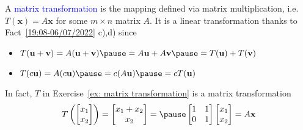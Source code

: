 \documentclass{beamer}
\theoremstyle{definition}
\theoremstyle{remark}
\begin{document}
\begin{frame}[t]
\begin{definition}
A \textcolor{blue}{matrix transformation} is the mapping defined via matrix multiplication, i.e. $T(\mathbf x)=A\mathbf x$ for some $m\times n$ matrix $A$\pause. It is a linear transformation thanks to Fact~\ref{19:08-06/07/2022} c),d) since
\begin{itemize}
\item $T(\mathbf u+\mathbf v)=A(\mathbf u+\mathbf v)\pause=A\mathbf u+A\mathbf v\pause=T(\mathbf u)+T(\mathbf v)$
\item $T(c\mathbf u)=A(c\mathbf u)\pause=c(A\mathbf u)\pause=cT(\mathbf u)$
\end{itemize}
\end{definition}
\pause
\begin{example}
In fact, $T$ in Exercise~\ref{ex: matrix transformation} is a matrix transformation
\[
T\left(\begin{bmatrix}
x_1\\x_2
\end{bmatrix}\right)=\begin{bmatrix}
x_1+x_2\\
x_2
\end{bmatrix}=\pause\begin{bmatrix}
1&1\\0&1
\end{bmatrix}\begin{bmatrix}
x_1\\x_2
\end{bmatrix}=A\mathbf x
\]
\end{example}
\end{frame}
\end{document}
